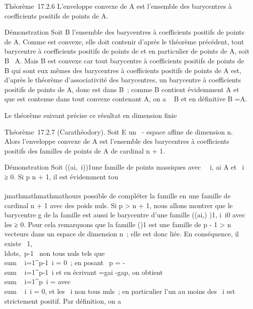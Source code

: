 Théorème~17.2.6 L'enveloppe convexe \hatA de A est
l'ensemble des barycentres à coefficients positifs de points de A.

Démonstration Soit B l'ensemble des barycentres à coefficients positifs
de points de A. Comme \hatA est convexe, elle doit
contenir d'après le théorème précédent, tout barycentre à coefficients
positifs de points de \hatA et en particulier de
points de A, soit B \subset~\hat A. Mais B est convexe car
tout barycentre à coefficients positifs de points de B qui sont eux
mêmes des barycentres à coefficients positifs de points de A est,
d'après le théorème d'associativité des barycentres, un barycentre à
coefficients positifs de points de A, donc est dans B~; comme B contient
évidemment A et que \hatA est contenue dans tout
convexe contenant A, on a \hatA \subset~ B et en définitive
B =\hat A.

Le théorème suivant précise ce résultat en dimension finie

Théorème~17.2.7 (Carathéodory). Soit E un ~- espace affine de dimension
n. Alors l'enveloppe convexe \hatA de A est
l'ensemble des barycentres à coefficients positifs des familles de
points de A de cardinal n + 1.

Démonstration Soit \left
((ai,\lambda~i)\right )1\leqi\leqp une
famille de points massiques avec \forall~~i,
ai \in A et \lambda~i ≥ 0. Si p \leq n + 1, il est évidemment
tou\\\\jmathmathmathmathours possible de compléter la famille en une famille de cardinal n +
1 avec des poids nuls. Si p \textgreater{} n + 1, nous allons montrer
que le barycentre g de la famille est aussi le barycentre d'une famille
\left ((ai,\mui)\right
)1\leqi\leqp, i\neq~i0 avec les
\mui ≥ 0. Pour cela remarquons que la famille
(\overrightarrowapai)1\leqi{}
est une famille de p - 1 \textgreater{} n vecteurs dans un espace de
dimension n~; elle est donc liée. En conséquence, il existe
\alpha~1,\\ldots,\alpha~p-1~
non tous nuls tels que
\\sum ~
i=1^p-1\alpha~i\overrightarrowapai
= 0~; en posant \alpha~p =
-\\sum ~
i=1^p-1\alpha~i et en écrivant
\overrightarrowapai
=\overrightarrow gai
-\overrightarrow gap, on obtient
\\sum ~
i=1^p\alpha~i\overrightarrowgai
= avec
\\sum ~
i\alpha~i = 0, et les \alpha~i non tous nuls~; en
particulier l'un au moins des \alpha~i est strictement positif. Par
définition, on a \\\sum

